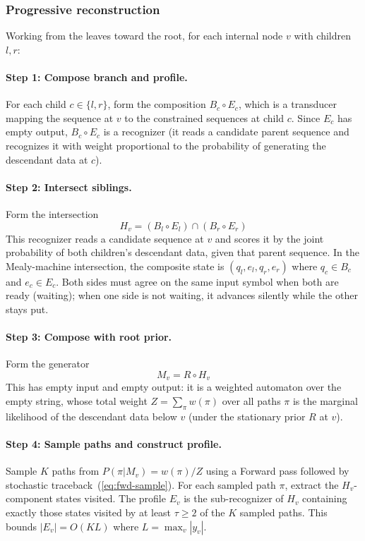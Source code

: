 \subsubsection{Progressive reconstruction}

Working from the leaves toward the root, for each internal node $v$ with children $l,r$:

\paragraph{Step 1: Compose branch and profile.}
For each child $c \in \{l,r\}$, form the composition
$B_c \circ E_c$,
which is a transducer mapping the sequence at $v$ to the constrained sequences at child $c$.
Since $E_c$ has empty output, $B_c \circ E_c$ is a recognizer
(it reads a candidate parent sequence and recognizes it with weight proportional to
the probability of generating the descendant data at $c$).

\paragraph{Step 2: Intersect siblings.}
Form the intersection
\[
H_v = (B_l \circ E_l) \cap (B_r \circ E_r)
\]
This recognizer reads a candidate sequence at $v$ and scores it by the joint probability
of both children's descendant data, given that parent sequence.
In the Mealy-machine intersection, the composite state is
$(q_l, e_l, q_r, e_r)$ where $q_c \in B_c$ and $e_c \in E_c$.
Both sides must agree on the same input symbol when both are ready (waiting);
when one side is not waiting, it advances silently while the other stays put.

\paragraph{Step 3: Compose with root prior.}
Form the generator
\[
M_v = R \circ H_v
\]
This has empty input and empty output: it is a weighted automaton
over the empty string, whose total weight $Z = \sum_\pi w(\pi)$ over all paths $\pi$
is the marginal likelihood of the descendant data below $v$
(under the stationary prior $R$ at $v$).

\paragraph{Step 4: Sample paths and construct profile.}
Sample $K$ paths from $P(\pi | M_v) = w(\pi) / Z$ using a Forward pass followed by
stochastic traceback~(\ref{eq:fwd-sample}).
For each sampled path $\pi$, extract the $H_v$-component states visited.
The profile $E_v$ is the sub-recognizer of $H_v$ containing exactly those states
visited by at least $\tau \geq 2$ of the $K$ sampled paths.
This bounds $|E_v| = O(KL)$ where $L = \max_v |y_v|$.

